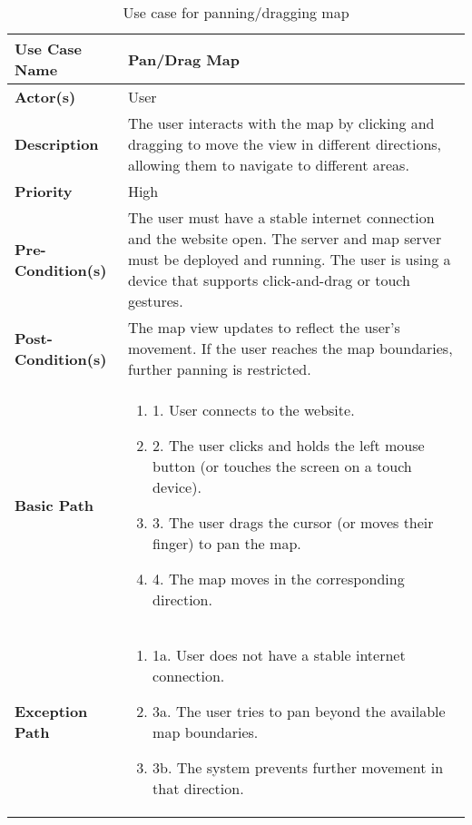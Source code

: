 \begin{table}[h]
    \centering
    \renewcommand{\arraystretch}{1.5}
    \begin{tabularx}{\textwidth}{|l|X|}
        \hline
        \rowcolor{gray!20}
        \textbf{Use Case Name} & Pan/Drag Map \\
        \hline
        \textbf{Actor(s)} & User \\
        \hline
        \textbf{Description} & The user interacts with the map by clicking and dragging to move the view in different directions, allowing them to navigate to different areas. \\ 
        \hline
        \textbf{Priority} & High \\
        \hline
        \textbf{Pre-Condition(s)} & The user must have a stable internet connection and the website open. The server and map server must be deployed and running. The user is using a device that supports click-and-drag or touch gestures.\\
        \hline
        \textbf{Post-Condition(s)} & The map view updates to reflect the user's movement. If the user reaches the map boundaries, further panning is restricted. \\
        \hline
        \textbf{Basic Path} &  
        \begin{enumerate}[label=,left=0pt]
            \item 1. User connects to the website.
            \item 2. The user clicks and holds the left mouse button (or touches the screen on a touch device).
            \item 3. The user drags the cursor (or moves their finger) to pan the map.
            \item 4. The map moves in the corresponding direction.
        \end{enumerate} \\
        \hline
        \textbf{Exception Path} & 
        \begin{enumerate}[label=,left=0pt]
            \item 1a. User does not have a stable internet connection.
            \item 3a. The user tries to pan beyond the available map boundaries.
            \item 3b. The system prevents further movement in that direction.
        \end{enumerate} \\
        \hline
    \end{tabularx}
    \caption*{Use case for panning/dragging map}
    \label{tab:use_case_drag_map_appendix}
\end{table}

